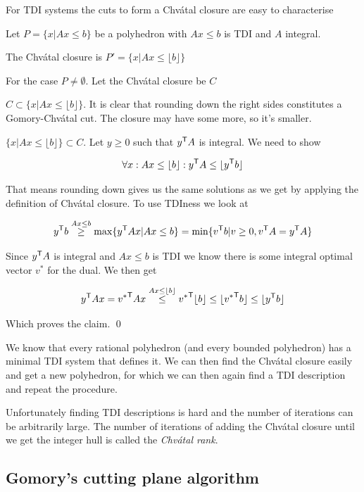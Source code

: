 For TDI systems the cuts to form a Chv\'{a}tal closure are easy to characterise

\begin{thm} Let $P=\{x|Ax\leq b\}$ be a polyhedron with $Ax\leq b$ is TDI and $A$ integral. 

The Chv\'{a}tal closure is $P'=\{x|Ax\leq \lfloor b\rfloor\}$
\end{thm}

\begin{pr}[]For the case $P\neq \emptyset$. Let the Chv\'{a}tal closure be $C$

$C\subset \{x|Ax\leq \lfloor b\rfloor\}$. It is clear that rounding down the right sides constitutes a Gomory-Chv\'{a}tal cut. The closure may have some more, so it's smaller.

$\{x|Ax\leq \lfloor b\rfloor\} \subset C$. Let $y\geq 0$ such that ${y}^\text{\upshape \sffamily T} A$ is integral. We need to show 

\[\forall x: Ax\leq \lfloor b \rfloor: {y}^\text{\upshape \sffamily T} A \leq \lfloor {y}^\text{\upshape \sffamily T} b\rfloor\]

That means rounding down gives us the same solutions as we get by applying the definition of Chv\'{a}tal closure. To use TDIness we look at

\[{y}^\text{\upshape \sffamily T}b \stackrel{Ax\leq b}{\geq} \max \{{y}^\text{\upshape \sffamily T} Ax | Ax\leq b\} = \min \{{v}^\text{\upshape \sffamily T} b|v\geq 0, {v}^\text{\upshape \sffamily T} A = {y}^\text{\upshape \sffamily T} A\}\]

Since ${y}^\text{\upshape \sffamily T} A$ is integral and $Ax\leq b$ is TDI we know there is some integral optimal vector $v^*$ for the dual. We then get

\[{y}^\text{\upshape \sffamily T} A x ={v^*}^\text{\upshape \sffamily T} A x \stackrel{Ax\leq \lfloor b\rfloor}{\leq} {v^*}^\text{\upshape \sffamily T} \lfloor b\rfloor \leq \lfloor {v^*}^\text{\upshape \sffamily T} b\rfloor \leq \lfloor {y}^\text{\upshape \sffamily T} b\rfloor\]

Which proves the claim.
\qed \end{pr}

We know that every rational polyhedron (and every bounded polyhedron) has a minimal TDI system that defines it. We can then find the Chv\'{a}tal closure easily and get a new polyhedron, for which we can then again find a TDI description and repeat the procedure.

Unfortunately finding TDI descriptions is hard and the number of iterations can be arbitrarily large. The number of iterations of adding the Chv\'{a}tal closure until we get the integer hull is called the \emph{Chv\'{a}tal rank}.

\subsection{Gomory's cutting plane algorithm}

